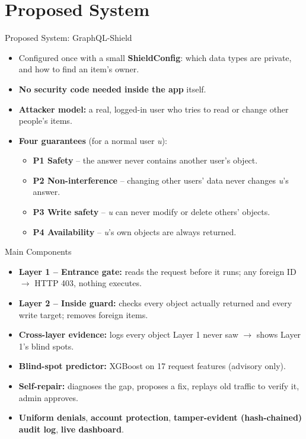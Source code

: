 \documentclass[aspectratio=169,11pt]{beamer}
\begin{document}
\section{Proposed System}
\begin{frame}{Proposed System: GraphQL-Shield}
\begin{itemize}
\item Configured once with a small \textbf{ShieldConfig}: which data types are private, and how to find an item’s owner.
\item \textbf{No security code needed inside the app} itself.
\item \textbf{Attacker model:} a real, logged-in user who tries to read or change other people’s items.
\item \textbf{Four guarantees} (for a normal user \emph{u}):
\begin{itemize}
\item \textbf{P1 Safety} – the answer never contains another user’s object.
\item \textbf{P2 Non-interference} – changing other users’ data never changes \emph{u}’s answer.
\item \textbf{P3 Write safety} – \emph{u} can never modify or delete others’ objects.
\item \textbf{P4 Availability} – \emph{u}’s own objects are always returned.
\end{itemize}
\end{itemize}
\end{frame}
\begin{frame}{Main Components}
\begin{itemize}
\item \textbf{Layer 1 – Entrance gate:} reads the request before it runs; any foreign ID $\rightarrow$ HTTP 403, nothing executes.
\item \textbf{Layer 2 – Inside guard:} checks every object actually returned and every write target; removes foreign items.
\item \textbf{Cross-layer evidence:} logs every object Layer 1 never saw $\rightarrow$ shows Layer 1’s blind spots.
\item \textbf{Blind-spot predictor:} XGBoost on 17 request features (advisory only).
\item \textbf{Self-repair:} diagnoses the gap, proposes a fix, replays old traffic to verify it, admin approves.
\item \textbf{Uniform denials}, \textbf{account protection}, \textbf{tamper-evident (hash-chained) audit log}, \textbf{live dashboard}.
\end{itemize}
\end{frame}
\end{document}
